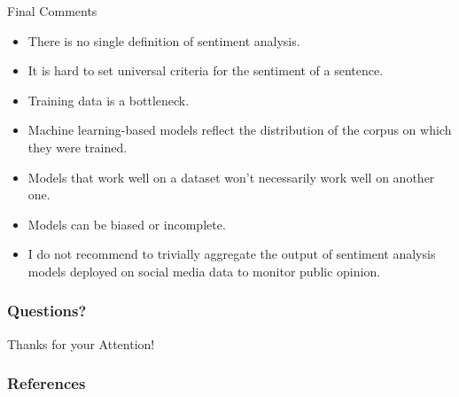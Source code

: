 \documentclass[handout]{beamer}
\begin{document}
\begin{frame}{Final Comments}
\begin{scriptsize}
\begin{itemize}
\item There is no single definition of sentiment analysis.
\item It is hard to set universal criteria for the sentiment of a sentence.
\item Training data is a bottleneck.
\item Machine learning-based models reflect the distribution of the corpus on which they were trained. 
\item Models that work well on a dataset won't necessarily work well on another one.
\item Models can be biased or incomplete.
\item I do not recommend to trivially aggregate the output of sentiment analysis models deployed on social media data to monitor public opinion.
\end{itemize}
\end{scriptsize}


\end{frame}










\begin{frame}
\frametitle{Questions?}
\begin{center}\LARGE Thanks for your Attention!\\ \end{center}



\end{frame}

\begin{frame}[allowframebreaks]\scriptsize
\frametitle{References}


%
\end{frame}  


\end{document}
